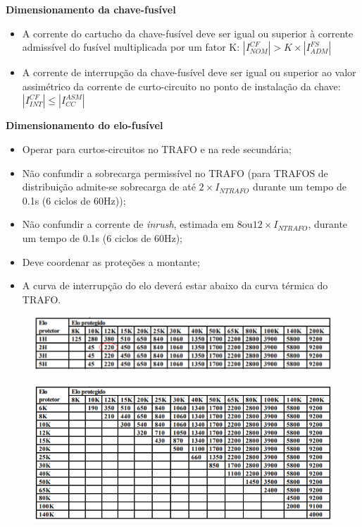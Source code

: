 \textbf{Dimensionamento da chave-fusível}
\begin{itemize}
    \item A corrente do cartucho da chave-fusível deve ser igual ou superior à corrente admissível do fusível multiplicada por um fator K: $|I_{NOM}^{CF}| > K \times |I_{ADM}^{FS}|$
    \item A corrente de interrupção da chave-fusível deve ser igual ou superior ao valor assimétrico da corrente de curto-circuito no ponto de instalação da chave: $|I_{INT}^{CF}| \leq |I_{CC}^{ASM}|$
\end{itemize}

\textbf{Dimensionamento do elo-fusível}
\begin{itemize}
    \item Operar para curtos-circuitos no TRAFO e na rede secundária;
    \item Não confundir a sobrecarga permissível no TRAFO (para TRAFOS de distribuição admite-se sobrecarga de até $2 \times I_{NTRAFO}$ durante um tempo de 0.1s (6 ciclos de 60Hz));
    \item Não confundir a corrente de \textit{inrush}, estimada em $8 \text{ou} 12 \times I_{NTRAFO}$, durante um tempo de 0.1s (6 ciclos de 60Hz);
    \item Deve coordenar as proteções a montante;
    \item A curva de interrupção do elo deverá estar abaixo da curva térmica do TRAFO.
    
\end{itemize}


\begin{figure}[H]
\begin{center}
\includegraphics[width=16cm]{tabela1.PNG}  
\label{fig:1} 
\end{center}
\end{figure}

\begin{figure}[H]
\begin{center}
\includegraphics[width=16cm]{tabela2.PNG}  
\label{fig:2} 
\end{center}
\end{figure}

